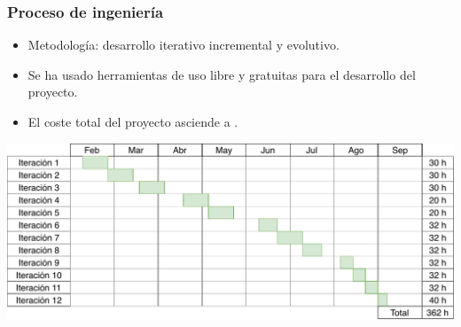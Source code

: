 \begin{frame}
\frametitle{Proceso de ingeniería}

\begin{itemize}
	\item<1-> Metodología: \textcolor{UDCpink}{desarrollo iterativo incremental y evolutivo}.
	
	\vspace{0.5em}
	
	\item<2-> Se ha usado herramientas de \textcolor{UDCpink}{uso libre y gratuitas} para el desarrollo del proyecto.
	
	\vspace{0.5em}
	
	\item<3-> El coste total del proyecto asciende a \textcolor{UDCpink}{}.
	
	\vspace{0.5em}	
\end{itemize}

\pause[4]

\centering
\includegraphics[width=\textwidth]{images/gantt.pdf}

\end{frame}
